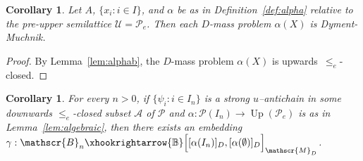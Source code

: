 \documentclass[11pt]{amsart}
\newtheorem{corollary}[theorem]{Corollary}
\DeclareMathOperator{\up}{Up}
\begin{document}
\begin{corollary}
Let $A$, $\{x_i: i \in I\}$, and $\alpha$ be as in Definition~\ref{def:alpha} 
relative to the pre-upper semilattice $\mathscr{U}=\mathscr{P}_e$. Then 
each $D$-mass problem $\alpha(X)$ is Dyment-Muchnik. 
\end{corollary}

\begin{proof}
By Lemma~\ref{lem:alphab}, the $D$-mass problem $\alpha(X)$ is 
upwards~$\leq_e$-closed. 
\end{proof}

\begin{corollary}\label{cor:all}
For every $n>0$, if $\{\psi_i: i \in I_n\}$ is a strong $u$--antichain in 
some downwards $\leq_e$-closed subset $\mathcal{A}$ of $\mathcal{P}$ and 
$\alpha: \mathcal{P}(I_n) \longrightarrow \up(\mathscr{P}_e)$ is as in 
Lemma~\ref{lem:algebraic}, then there exists an embedding  $\gamma: 
\mathscr{B}_n \xhookrightarrow{\mathbb{B}} \Big[[\alpha(I_n)]_D, 
[\alpha(\emptyset)]_D \Big]_{\mathscr{M}_D}$. 
\end{corollary}   
\end{document}
